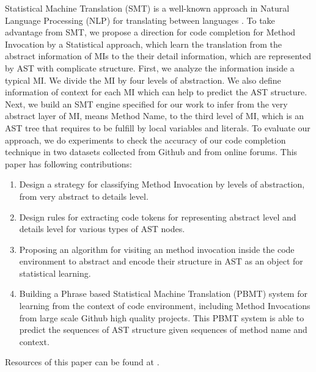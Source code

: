 Statistical Machine Translation (SMT) is a well-known approach in Natural Language Processing (NLP) for translating between languages \cite{Green2014}. To take advantage from SMT, we propose a direction for code completion for Method Invocation by a Statistical approach, which learn the translation from the abstract information of MIs to the their detail information, which are represented by AST with complicate structure. First, we analyze the information inside a typical MI. We divide the MI by four levels of abstraction. We also define information of context for each MI which can help to predict the AST structure. Next, we build an SMT engine specified for our work to infer from the very abstract layer of MI, means Method Name, to the third level of MI, which is an AST tree that requires to be fulfill by local variables and literals. To evaluate our approach, we do experiments to check the accuracy of our code completion technique in two datasets collected from Github and from online forums. 
This paper has following contributions:
\begin{enumerate}
  \item Design a strategy for classifying Method Invocation by levels of abstraction, from very abstract to details level.
  \item Design rules for extracting code tokens for representing abstract level and details level for various types of AST nodes.
  \item Proposing an algorithm for visiting an method invocation inside the code environment to abstract and encode their structure in AST as an object for statistical learning.
  \item Building a Phrase based Statistical Machine Translation (PBMT) system for learning from the context of code environment, including Method Invocations from large scale Github high quality projects. This PBMT system is able to predict the sequences of AST structure given sequences of method name and context.  
\end{enumerate}
Resources of this paper can be found at \cite{id:InvocMap}.



